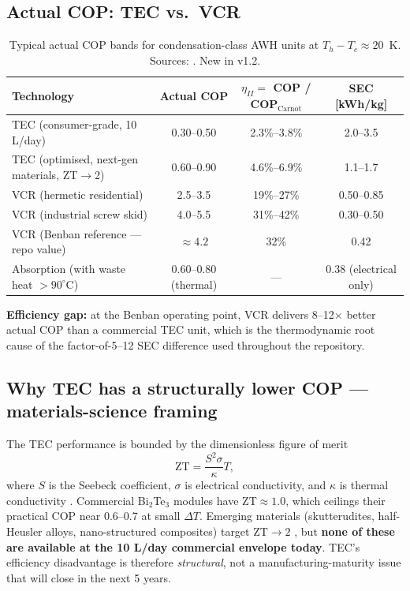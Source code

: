\documentclass[11pt,a4paper]{article}
\begin{document}
\subsection{Actual COP: TEC vs.\ VCR}
\begin{table}[h]
\centering\small
\caption{Typical actual COP bands for condensation-class AWH units at $T_h-T_c\approx 20$~K. Sources: \citep{enescu2019peltierreview,salehi2020awgreview,twaha2016teg_review,lowes_vcr_2023}. New in v1.2.}
\label{tab:cop_compare}
\begin{tabular}{@{}lccc@{}}
\toprule
\textbf{Technology} & \textbf{Actual COP} & \textbf{$\eta_{II}=$ COP / COP$_{\mathrm{Carnot}}$} & \textbf{SEC [kWh/kg]} \\
\midrule
TEC (consumer-grade, 10 L/day)   & 0.30--0.50 & 2.3\%--3.8\%  & 2.0--3.5 \\
TEC (optimised, next-gen materials, ZT$\to$2) & 0.60--0.90 & 4.6\%--6.9\% & 1.1--1.7 \\
VCR (hermetic residential)       & 2.5--3.5   & 19\%--27\%    & 0.50--0.85 \\
VCR (industrial screw skid)      & 4.0--5.5   & 31\%--42\%    & 0.30--0.50 \\
VCR (Benban reference --- repo value) & $\approx 4.2$ & 32\% & 0.42 \\
Absorption (with waste heat $>90^\circ$C) & 0.60--0.80 (thermal) & --- & 0.38 (electrical only) \\
\bottomrule
\end{tabular}
\end{table}

\textbf{Efficiency gap:} at the Benban operating point, VCR delivers 8--12$\times$ better actual COP than a commercial TEC unit, which is the thermodynamic root cause of the factor-of-5--12 SEC difference used throughout the repository.

\subsection{Why TEC has a structurally lower COP --- materials-science framing}
The TEC performance is bounded by the dimensionless figure of merit
\begin{equation}
\mathrm{ZT} = \frac{S^2\sigma}{\kappa}T,
\label{eq:zt}
\end{equation}
where $S$ is the Seebeck coefficient, $\sigma$ is electrical conductivity, and $\kappa$ is thermal conductivity \citep{twaha2016teg_review}. Commercial Bi$_2$Te$_3$ modules have $\mathrm{ZT}\approx 1.0$, which ceilings their practical COP near 0.6--0.7 at small $\Delta T$. Emerging materials (skutterudites, half-Heusler alloys, nano-structured composites) target $\mathrm{ZT}\to 2$ \citep{enescu2019peltierreview}, but \textbf{none of these are available at the 10 L/day commercial envelope today}. TEC's efficiency disadvantage is therefore \emph{structural}, not a manufacturing-maturity issue that will close in the next 5 years.
\end{document}

